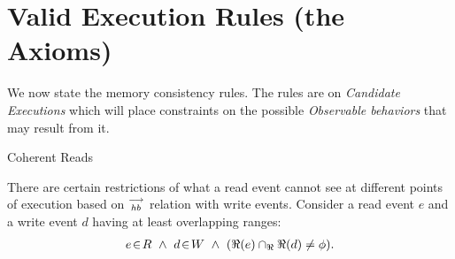         
    \section{Valid Execution Rules (the Axioms)}
        We now state the memory consistency rules. 
        The rules are on \textit{Candidate Executions} which will place constraints on the possible \textit{Observable behaviors} that may result from it. 
         
        \begin{axiom}{Coherent Reads} 
            \label{CoRe}
        
            There are certain restrictions of what a read event cannot see at different points of execution based on $\stackrel{\longrightarrow}{_{hb}}$ relation with write events. 
            Consider a read event $e$ and a write event $d$ having at least overlapping ranges:
            \begin{align*}
                \event{e}{R} \ \wedge \ 
                \event{d}{W} \ \wedge \
                (\Re(e) \cap_\Re \Re(d) \neq \phi).
            \end{align*}


\end{axiom}

